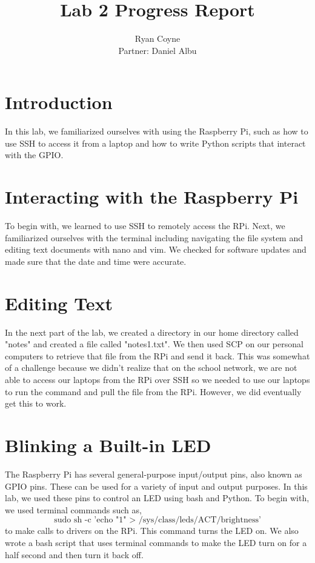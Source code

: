 \documentclass{article}
\title{Lab 2 Progress Report}
\author{Ryan Coyne \\ Partner: Daniel Albu}
\begin{document}
\maketitle

\section{Introduction}
In this lab, we familiarized ourselves with using the Raspberry Pi, such as how to use SSH to access it from a laptop and how to write Python scripts that interact with the GPIO.

\section{Interacting with the Raspberry Pi}
To begin with, we learned to use SSH to remotely access the RPi. Next, we familiarized ourselves with the terminal including navigating the file system and editing text documents with nano and vim. We checked for software updates and made sure that the date and time were accurate. 

\section{Editing Text}
In the next part of the lab, we created a directory in our home directory called "notes" and created a file called "notes1.txt". We then used SCP on our personal computers to retrieve that file from the RPi and send it back. This was somewhat of a challenge because we didn't realize that on the school network, we are not able to access our laptops from the RPi over SSH so we needed to use our laptops to run the command and pull the file from the RPi. However, we did eventually get this to work. 

\section{Blinking a Built-in LED}
The Raspberry Pi has several general-purpose input/output pins, also known as GPIO pins. These can be used for a variety of input and output purposes. In this lab, we used these pins to control an LED using bash and Python. To begin with, we used terminal commands such as, \[\text{sudo sh -c 'echo "1" \(>\) /sys/class/leds/ACT/brightness'}\] to make calls to drivers on the RPi. This command turns the LED on. We also wrote a bash script that uses terminal commands to make the LED turn on for a half second and then turn it back off. 
\end{document}
